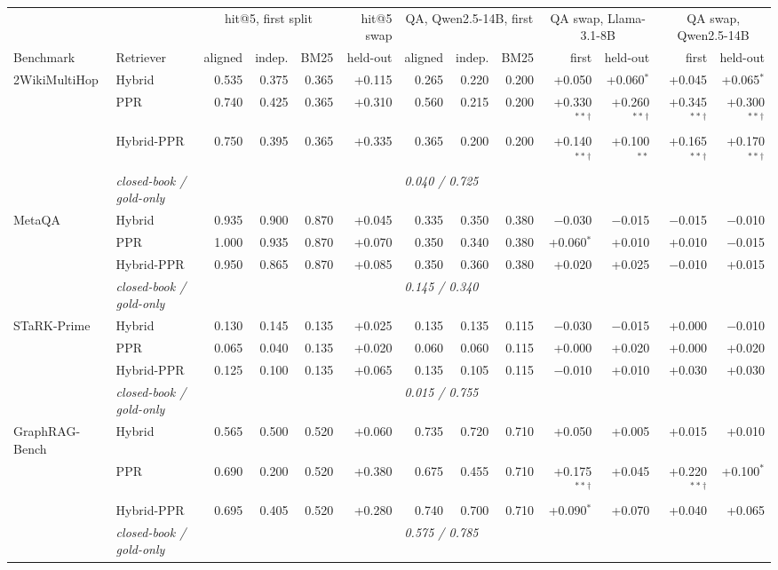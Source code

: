 \begin{tabular}{llrrrrrrrrrrr}
\toprule
 & & \multicolumn{3}{c}{hit@5, first split} & hit@5 swap & \multicolumn{3}{c}{QA, Qwen2.5-14B, first} & \multicolumn{2}{c}{QA swap, Llama-3.1-8B} & \multicolumn{2}{c}{QA swap, Qwen2.5-14B}\\
\cmidrule(lr){3-5}\cmidrule(lr){6-6}\cmidrule(lr){7-9}\cmidrule(lr){10-11}\cmidrule(lr){12-13}
Benchmark & Retriever & aligned & indep. & BM25 & held-out & aligned & indep. & BM25 & first & held-out & first & held-out\\
\midrule
2WikiMultiHop & Hybrid & 0.535 & 0.375 & 0.365 & +0.115 & 0.265 & 0.220 & 0.200 & +0.050 & +0.060$^{*}$ & +0.045 & +0.065$^{*}$\\
 & PPR & 0.740 & 0.425 & 0.365 & +0.310 & 0.560 & 0.215 & 0.200 & +0.330$^{**}$$^{\dagger}$ & +0.260$^{**}$$^{\dagger}$ & +0.345$^{**}$$^{\dagger}$ & +0.300$^{**}$$^{\dagger}$\\
 & Hybrid-PPR & 0.750 & 0.395 & 0.365 & +0.335 & 0.365 & 0.200 & 0.200 & +0.140$^{**}$$^{\dagger}$ & +0.100$^{**}$ & +0.165$^{**}$$^{\dagger}$ & +0.170$^{**}$$^{\dagger}$\\
 & \textit{closed-book / gold-only} & & & & & \multicolumn{3}{l}{\textit{0.040 / 0.725}} & & & & \\
\midrule
MetaQA & Hybrid & 0.935 & 0.900 & 0.870 & +0.045 & 0.335 & 0.350 & 0.380 & $-$0.030 & $-$0.015 & $-$0.015 & $-$0.010\\
 & PPR & 1.000 & 0.935 & 0.870 & +0.070 & 0.350 & 0.340 & 0.380 & +0.060$^{*}$ & +0.010 & +0.010 & $-$0.015\\
 & Hybrid-PPR & 0.950 & 0.865 & 0.870 & +0.085 & 0.350 & 0.360 & 0.380 & +0.020 & +0.025 & $-$0.010 & +0.015\\
 & \textit{closed-book / gold-only} & & & & & \multicolumn{3}{l}{\textit{0.145 / 0.340}} & & & & \\
\midrule
STaRK-Prime & Hybrid & 0.130 & 0.145 & 0.135 & +0.025 & 0.135 & 0.135 & 0.115 & $-$0.030 & $-$0.015 & +0.000 & $-$0.010\\
 & PPR & 0.065 & 0.040 & 0.135 & +0.020 & 0.060 & 0.060 & 0.115 & +0.000 & +0.020 & +0.000 & +0.020\\
 & Hybrid-PPR & 0.125 & 0.100 & 0.135 & +0.065 & 0.135 & 0.105 & 0.115 & $-$0.010 & +0.010 & +0.030 & +0.030\\
 & \textit{closed-book / gold-only} & & & & & \multicolumn{3}{l}{\textit{0.015 / 0.755}} & & & & \\
\midrule
GraphRAG-Bench & Hybrid & 0.565 & 0.500 & 0.520 & +0.060 & 0.735 & 0.720 & 0.710 & +0.050 & +0.005 & +0.015 & +0.010\\
 & PPR & 0.690 & 0.200 & 0.520 & +0.380 & 0.675 & 0.455 & 0.710 & +0.175$^{**}$$^{\dagger}$ & +0.045 & +0.220$^{**}$$^{\dagger}$ & +0.100$^{*}$\\
 & Hybrid-PPR & 0.695 & 0.405 & 0.520 & +0.280 & 0.740 & 0.700 & 0.710 & +0.090$^{*}$ & +0.070 & +0.040 & +0.065\\
 & \textit{closed-book / gold-only} & & & & & \multicolumn{3}{l}{\textit{0.575 / 0.785}} & & & & \\
\bottomrule
\end{tabular}

